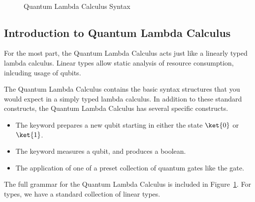 \begin{figure}[t]
    \begin{syntax}
            \\
            \alternative{!\tau}
            
            \\
            \\
            \\
            \\
            \\
    \end{syntax}
\caption{Quantum Lambda Calculus Syntax}
\label{fig:qcalc_syntax}
\end{figure}
\subsection{Introduction to Quantum Lambda Calculus}
For the most part, the Quantum Lambda Calculus acts just like a linearly typed lambda calculus.
Linear types allow static analysis of resource consumption, inlcuding usage of qubits.

The Quantum Lambda Calculus contains the basic syntax structures that you would expect in a simply typed lambda calculus.
In addition to these standard constructs, the Quantum Lambda Calculus has several specific constructs.
\begin{itemize}
\item The  keyword prepares a new qubit starting in either the state $\ket{0}$ or $\ket{1}$.
\item The  keyword measures a qubit, and produces a boolean.
\item The application of one of a preset collection of quantum gates like the  gate.
\end{itemize}
The full grammar for the Quantum Lambda Calculus is included in Figure~\ref{fig:qcalc_syntax}.
For types, we have a standard collection of linear types.



